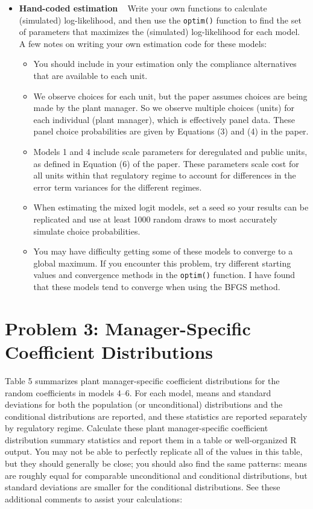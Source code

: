 \documentclass[11pt,letterpaper]{article}
\begin{document}
\begin{itemize}[label={}, leftmargin=*]
	\item \textbf{Hand-coded estimation} ~ Write your own functions to calculate (simulated) log-likelihood, and then use the \texttt{optim()} function to find the set of parameters that maximizes the (simulated) log-likelihood for each model. A few notes on writing your own estimation code for these models:
	\begin{itemize}
		\item You should include in your estimation only the compliance alternatives that are available to each unit.
		\item We observe choices for each unit, but the paper assumes choices are being made by the plant manager. So we observe multiple choices (units) for each individual (plant manager), which is effectively panel data. These panel choice probabilities are given by Equations (3) and (4) in the paper.
		\item Models 1 and 4 include scale parameters for deregulated and public units, as defined in Equation (6) of the paper. These parameters scale cost for all units within that regulatory regime to account for differences in the error term variances for the different regimes.
		\item When estimating the mixed logit models, set a seed so your results can be replicated and use at least 1000 random draws to most accurately simulate choice probabilities.
		\item You may have difficulty getting some of these models to converge to a global maximum. If you encounter this problem, try different starting values and convergence methods in the \texttt{optim()} function. I have found that these models tend to converge when using the BFGS method.
	\end{itemize}
\end{itemize}

\section*{Problem 3: Manager-Specific Coefficient Distributions}

Table 5 summarizes plant manager-specific coefficient distributions for the random coefficients in models 4--6. For each model, means and standard deviations for both the population (or unconditional) distributions and the conditional distributions are reported, and these statistics are reported separately by regulatory regime. Calculate these plant manager-specific coefficient distribution summary statistics and report them in a table or well-organized R output. You may not be able to perfectly replicate all of the values in this table, but they should generally be close; you should also find the same patterns: means are roughly equal for comparable unconditional and conditional distributions, but standard deviations are smaller for the conditional distributions. See these additional comments to assist your calculations:
\end{document}

